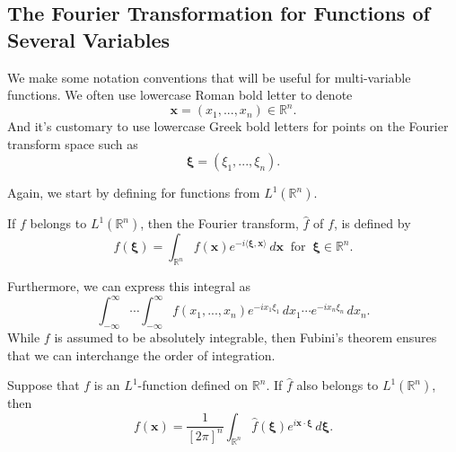 \subsection{The Fourier Transformation for Functions of Several Variables}

We make some notation conventions that will be useful for multi-variable functions. We often use lowercase Roman bold letter to denote 
\[\mathbf x=(x_1,...,x_n)\in\mathbb R^n.\]
And it's customary to use lowercase Greek bold letters for points on the Fourier transform space such as 
\[\mathbf{\xi}=(\xi_1,...,\xi_n).\]

Again, we start by defining for functions from $L^1(\mathbb R^n)$.
\begin{definition}[Definition 4.5.1.]
    If $f$ belongs to $L^1(\mathbb R^n)$, then the Fourier transform, $\hat f$ of $f$, is defined by 
    \[\hat f(\mathbf{\xi})=\int_{\mathbb R^n} f(\mathbf x)e^{-i\langle \mathbf{\xi},\mathbf x\rangle}\,d\mathbf x ~\text{ for }~ \mathbf{\xi}\in\mathbb R^n.\]
\end{definition}
Furthermore, we can express this integral as 
\[\int_{-\infty}^{\infty}\cdots\int_{-\infty}^{\infty}f(x_1,...,x_n)e^{-ix_1\xi_1}\,dx_1\cdots e^{-ix_n\xi_n}\,dx_n.\]
While $f$ is assumed to be absolutely integrable, then Fubini's theorem ensures that we can interchange the order of integration. 

\begin{theorem}
    Suppose that $f$ is an $L^1$-function defined on $\mathbb R^n$. If $\hat f$ also belongs to $L^1(\mathbb R^n)$, then 
    \[f(\mathbf x)=\frac{1}{[2\pi]^n}\int_{\mathbb R^n} \hat f(\mathbf{\xi})e^{i\mathbf x\cdot \mathbf{\xi}}\,d\mathbf{\xi}.\]
\end{theorem}